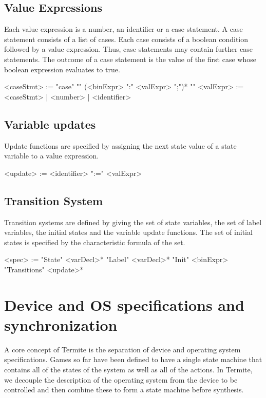 \subsection{Value Expressions}
Each value expression is a number, an identifier or a case statement. A case statement consists of a list of cases. Each case consists of a boolean condition followed by a value expression. Thus, case statements may contain further case statements. The outcome of a case statement is the value of the first case whose boolean expression evaluates to true.

\begin{bnflisting}
    <caseStmt> := "case" "{" 
                      (<binExpr> ":" <valExpr> ";")*
                  "}"
    <valExpr>  := <caseStmt> | <number> | <identifier>
\end{bnflisting}

\subsection{Variable updates}

Update functions are specified by assigning the next state value of a state variable to a value expression.

\begin{bnflisting}
    <update>   := <identifier> ":=" <valExpr>
\end{bnflisting}

\subsection{Transition System}

Transition systems are defined by giving the set of state variables, the set of label variables, the initial states and the variable update functions. The set of initial states is specified by the characteristic formula of the set.

\begin{bnflisting}
    <spec>     := "State"       <varDecl>* 
                  "Label"       <varDecl>* 
                  "Init"        <binExpr>
                  "Transitions" <update>*
\end{bnflisting}

\section{Device and OS specifications and synchronization}

A core concept of Termite is the separation of device and operating system specifications. Games so far have been defined to have a single state machine that contains all of the states of the system as well as all of the actions. In Termite, we decouple the description of the operating system from the device to be controlled and then combine these to form a state machine before synthesis.

